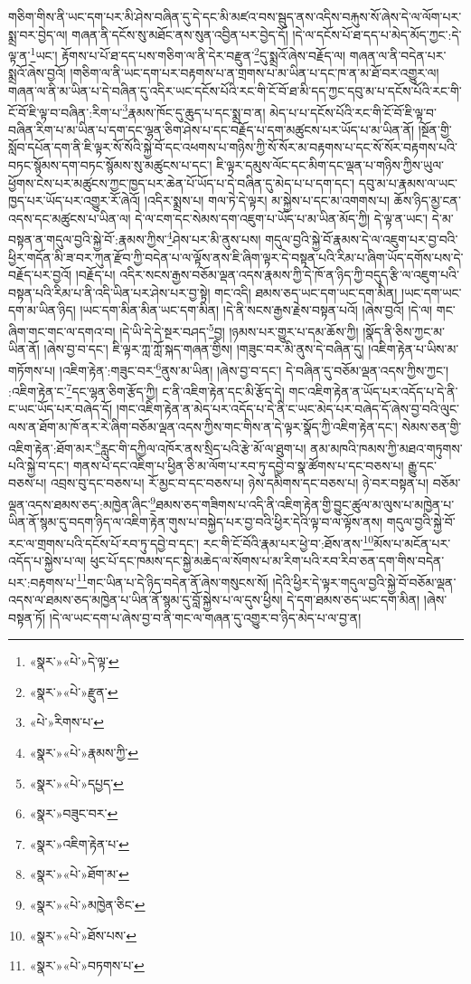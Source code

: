 གཅིག་གིས་ནི་ཡང་དག་པར་མི་ཤེས་བཞིན་དུ་དེ་དང་མི་མཛའ་བས་སྦུད་ནས་འདིས་བརྐུས་སོ་ཞེས་དེ་ལ་ལོག་པར་སྨྲ་བར་བྱེད་ལ། གཞན་ནི་དངོས་སུ་མཐོང་ནས་སུན་འབྱིན་པར་བྱེད་དོ། །དེ་ལ་དངོས་པོ་ཐ་དད་པ་མེད་མོད་ཀྱང་:དེ་ལྟ་ན་\footnote{«སྣར་»«པེ་»དེ་ལྟ་}ཡང་། རྟོགས་པ་པོ་ཐ་དད་པས་གཅིག་ལ་ནི་དེར་བརྫུན་\footnote{«སྣར་»«པེ་»རྫུན་}དུ་སྨྲའོ་ཞེས་བརྗོད་ལ། གཞན་ལ་ནི་བདེན་པར་སྨྲའོ་ཞེས་བྱའོ། །གཅིག་ལ་ནི་ཡང་དག་པར་བརྟགས་པ་ན་གྲགས་པ་མ་ཡིན་པ་དང་ཁ་ན་མ་ཐོ་བར་འགྱུར་ལ། གཞན་ལ་ནི་མ་ཡིན་པ་དེ་བཞིན་དུ་འདིར་ཡང་དངོས་པོའི་རང་གི་ངོ་བོ་ཐ་མི་དད་ཀྱང་དབུ་མ་པ་དངོས་པོའི་རང་གི་ངོ་བོ་ཇི་ལྟ་བ་བཞིན་:རིག་པ་\footnote{«པེ་»རིགས་པ་}རྣམས་ཁོང་དུ་ཆུད་པ་དང་སྨྲ་བ་ན། མེད་པ་པ་དངོས་པོའི་རང་གི་ངོ་བོ་ཇི་ལྟ་བ་བཞིན་རིག་པ་མ་ཡིན་པ་དག་དང་ལྷན་ཅིག་ཤེས་པ་དང་བརྗོད་པ་དག་མཚུངས་པར་ཡོད་པ་མ་ཡིན་ནོ། །སྔོན་གྱི་སློབ་དཔོན་དག་ནི་ཇི་ལྟར་སོ་སོའི་སྐྱེ་བོ་དང་འཕགས་པ་གཉིས་ཀྱི་སོ་སོར་མ་བརྟགས་པ་དང་སོ་སོར་བརྟགས་པའི་བཏང་སྙོམས་དག་བཏང་སྙོམས་སུ་མཚུངས་པ་དང་། ཇི་ལྟར་དམུས་ལོང་དང་མིག་དང་ལྡན་པ་གཉིས་ཀྱིས་ཡུལ་ཕྱོགས་ངེས་པར་མཚུངས་ཀྱང་ཁྱད་པར་ཆེན་པོ་ཡོད་པ་དེ་བཞིན་དུ་མེད་པ་པ་དག་དང་། དབུ་མ་པ་རྣམས་ལ་ཡང་ཁྱད་པར་ཡོད་པར་འགྱུར་རོ་ཞེའོ། །འདིར་སྨྲས་པ། གལ་ཏེ་དེ་ལྟར། མ་སྐྱེས་པ་དང་མ་འགགས་པ། ཆོས་ཉིད་མྱ་ངན་འདས་དང་མཚུངས་པ་ཡིན་ལ། དེ་ལ་ངག་དང་སེམས་དག་འཇུག་པ་ཡོད་པ་མ་ཡིན་མོད་ཀྱི། དེ་ལྟ་ན་ཡང་། དེ་མ་བསྟན་ན་གདུལ་བྱའི་སྐྱེ་བོ་:རྣམས་ཀྱིས་\footnote{«སྣར་»«པེ་»རྣམས་ཀྱི་}ཤེས་པར་མི་ནུས་པས། གདུལ་བྱའི་སྐྱེ་བོ་རྣམས་དེ་ལ་འཇུག་པར་བྱ་བའི་ཕྱིར་གདོན་མི་ཟ་བར་ཀུན་རྫོབ་ཀྱི་བདེན་པ་ལ་ལྟོས་ནས་ཇི་ཞིག་ལྟར་དེ་བསྟན་པའི་རིམ་པ་ཞིག་ཡོད་དགོས་པས་དེ་བརྗོད་པར་བྱའོ། །བརྗོད་པ། འདིར་སངས་རྒྱས་བཅོམ་ལྡན་འདས་རྣམས་ཀྱི་དེ་ཁོ་ན་ཉིད་ཀྱི་བདུད་རྩི་ལ་འཇུག་པའི་བསྟན་པའི་རིམ་པ་ནི་འདི་ཡིན་པར་ཤེས་པར་བྱ་སྟེ། གང་འདི། ཐམས་ཅད་ཡང་དག་ཡང་དག་མིན། །ཡང་དག་ཡང་དག་མ་ཡིན་ཉིད། །ཡང་དག་མིན་མིན་ཡང་དག་མིན། །དེ་ནི་སངས་རྒྱས་རྗེས་བསྟན་པའོ། །ཞེས་བྱའོ། །དེ་ལ། གང་ཞིག་གང་གང་ལ་དགའ་བ། །དེ་ཡི་དེ་དེ་སྔར་བཤད་\footnote{«སྣར་»«པེ་»དཔྱད་}བྱ། །ཉམས་པར་གྱུར་པ་དམ་ཆོས་ཀྱི། །སྣོད་ནི་ཅིས་ཀྱང་མ་ཡིན་ནོ། །ཞེས་བྱ་བ་དང་། ཇི་ལྟར་ཀླ་ཀློ་སྐད་གཞན་གྱིས། །གཟུང་བར་མི་ནུས་དེ་བཞིན་དུ། །འཇིག་རྟེན་པ་ཡིས་མ་གཏོགས་པ། །འཇིག་རྟེན་:གཟུང་བར་\footnote{«སྣར་»བཟུང་བར་}ནུས་མ་ཡིན། །ཞེས་བྱ་བ་དང་། དེ་བཞིན་དུ་བཅོམ་ལྡན་འདས་ཀྱིས་ཀྱང་། :འཇིག་རྟེན་ང་\footnote{«སྣར་»འཇིག་རྟེན་པ་}དང་ལྷན་ཅིག་རྩོད་ཀྱི། ང་ནི་འཇིག་རྟེན་དང་མི་རྩོད་དེ། གང་འཇིག་རྟེན་ན་ཡོད་པར་འདོད་པ་དེ་ནི་ང་ཡང་ཡོད་པར་བཞེད་དོ། །གང་འཇིག་རྟེན་ན་མེད་པར་འདོད་པ་དེ་ནི་ང་ཡང་མེད་པར་བཞེད་དོ་ཞེས་བྱ་བའི་ལུང་ལས་ན་ཐོག་མ་ཁོ་ནར་རེ་ཞིག་བཅོམ་ལྡན་འདས་ཀྱིས་གང་གིས་ན་དེ་ལྟར་སྣོད་ཀྱི་འཇིག་རྟེན་དང་། སེམས་ཅན་གྱི་འཇིག་རྟེན་:ཐོག་མར་\footnote{«སྣར་»«པེ་»ཐོག་མ་}རླུང་གི་དཀྱིལ་འཁོར་ནས་སྲིད་པའི་རྩེ་མོ་ལ་ཐུག་པ། ནམ་མཁའི་ཁམས་ཀྱི་མཐའ་གཏུགས་པའི་སྐྱེ་བ་དང་། གནས་པ་དང་འཇིག་པ་ཕྱིན་ཅི་མ་ལོག་པ་རབ་ཏུ་དབྱེ་བ་སྣ་ཚོགས་པ་དང་བཅས་པ། རྒྱུ་དང་བཅས་པ། འབྲས་བུ་དང་བཅས་པ། རོ་མྱང་བ་དང་བཅས་པ། ཉེས་དམིགས་དང་བཅས་པ། ཉེ་བར་བསྟན་པ། བཅོམ་ལྡན་འདས་ཐམས་ཅད་:མཁྱེན་ཞིང་\footnote{«སྣར་»«པེ་»མཁྱེན་ཅིང་}ཐམས་ཅད་གཟིགས་པ་འདི་ནི་འཇིག་རྟེན་གྱི་བྱུང་ཚུལ་མ་ལུས་པ་མཁྱེན་པ་ཡིན་ནོ་སྙམ་དུ་བདག་ཉིད་ལ་འཇིག་རྟེན་གུས་པ་བསྐྱེད་པར་བྱ་བའི་ཕྱིར་དེའི་ལྟ་བ་ལ་ལྟོས་ནས། གདུལ་བྱའི་སྐྱེ་བོ་རང་ལ་གྲགས་པའི་དངོས་པོ་རབ་ཏུ་དབྱེ་བ་དང་། རང་གི་ངོ་བོའི་རྣམ་པར་ཕྱེ་བ་:ཐོས་ནས་\footnote{«སྣར་»«པེ་»ཐོས་པས་}མོས་པ་མངོན་པར་འདོད་པ་སྐྱེས་པ་ལ། ཕུང་པོ་དང་ཁམས་དང་སྐྱེ་མཆེད་ལ་སོགས་པ་མ་རིག་པའི་རབ་རིབ་ཅན་དག་གིས་བདེན་པར་:བརྟགས་པ་\footnote{«སྣར་»«པེ་»བཏགས་པ་}གང་ཡིན་པ་དེ་ཉིད་བདེན་ནོ་ཞེས་གསུངས་སོ། །དེའི་ཕྱིར་དེ་ལྟར་གདུལ་བྱའི་སྐྱེ་བོ་བཅོམ་ལྡན་འདས་ལ་ཐམས་ཅད་མཁྱེན་པ་ཡིན་ནོ་སྙམ་དུ་བློ་སྐྱེས་པ་ལ་དུས་ཕྱིས། དེ་དག་ཐམས་ཅད་ཡང་དག་མིན། །ཞེས་བསྟན་ཏོ། །དེ་ལ་ཡང་དག་པ་ཞེས་བྱ་བ་ནི་གང་ལ་གཞན་དུ་འགྱུར་བ་ཉིད་མེད་པ་ལ་བྱ་ན། 